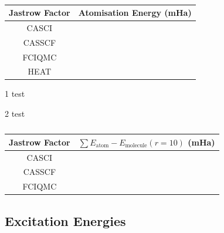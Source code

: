 \begin{table}[!h]
    \centering
    \begin{threeparttable}
        \begin{tabular}{c|c}
            Jastrow Factor & Atomisation Energy (mHa) \\
            \hline
            CASCI & \todo{...}\tnote{1} \\
            CASSCF & \todo{...} \\
            FCIQMC & \todo{...}\tnote{1} \\
            \bottomrule
            HEAT & \todo{...}
        \end{tabular}
        \begin{tablenotes}
            \item[1] \todo{} test
            \item[2] \todo{} test
        \end{tablenotes}
    \end{threeparttable}
    \caption{}
    \label{tbl:binding-atomisation-energies}
\end{table}

\begin{table}[!h]
    \centering
    \begin{tabular}{c|c}
        Jastrow Factor & $\sum E_\mathrm{atom} - E_\mathrm{molecule}(r=10)$ (mHa) \\
        \hline
        CASCI & \todo{...} \\
        CASSCF & \todo{...} \\
        FCIQMC & \todo{...}
    \end{tabular}
    \caption{}
    \label{tbl:size-consistency}
\end{table}


\subsection{Excitation Energies}


